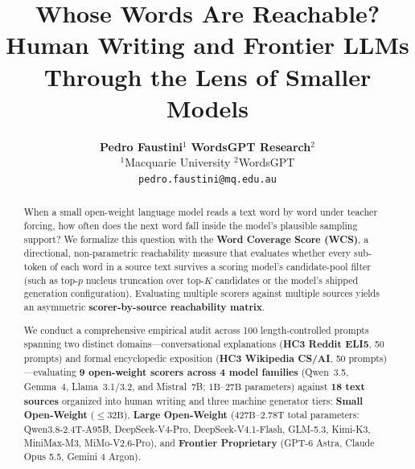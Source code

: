 \documentclass[11pt,a4paper,twocolumn]{article}
\title{\textbf{Whose Words Are Reachable? Human Writing and Frontier LLMs Through the Lens of Smaller Models}}
\author{
  \textbf{Pedro Faustini}$^{1}$ \quad \textbf{WordsGPT Research}$^{2}$ \\
  $^{1}$Macquarie University \quad $^{2}$WordsGPT \\
  \texttt{pedro.faustini@mq.edu.au}
}
\date{}
\begin{document}
\maketitle

\begin{abstract}
When a small open-weight language model reads a text word by word under teacher forcing, how often does the next word fall inside the model's plausible sampling support? We formalize this question with the \textbf{Word Coverage Score (WCS)}, a directional, non-parametric reachability measure that evaluates whether every sub-token of each word in a source text survives a scoring model's candidate-pool filter (such as top-$p$ nucleus truncation over top-$K$ candidates or the model's shipped generation configuration). Evaluating multiple scorers against multiple sources yields an asymmetric \textbf{scorer-by-source reachability matrix}.

We conduct a comprehensive empirical audit across 100 length-controlled prompts spanning two distinct domains---conversational explanations (\textbf{HC3 Reddit ELI5}, 50 prompts) and formal encyclopedic exposition (\textbf{HC3 Wikipedia CS/AI}, 50 prompts)---evaluating \textbf{9 open-weight scorers across 4 model families} (Qwen~3.5, Gemma~4, Llama~3.1/3.2, and Mistral~7B; $1\text{B}$--$27\text{B}$ parameters) against \textbf{18 text sources} organized into human writing and three machine generator tiers: \textbf{Small Open-Weight} ($\le 32\text{B}$), \textbf{Large Open-Weight} ($427\text{B}$--$2.78\text{T}$ total parameters: Qwen3.8-2.4T-A95B, DeepSeek-V4-Pro, DeepSeek-V4.1-Flash, GLM-5.3, Kimi-K3, MiniMax-M3, MiMo-V2.6-Pro), and \textbf{Frontier Proprietary} (GPT-6 Astra, Claude Opus 5.5, Gemini 4 Argon).


\end{abstract}
\end{document}
